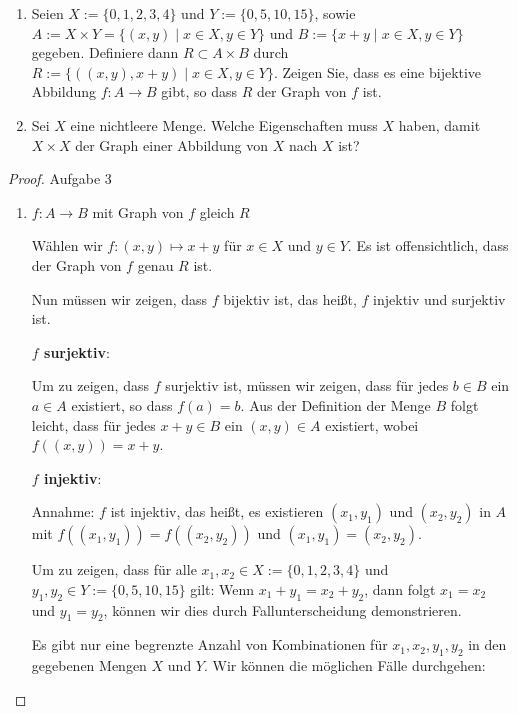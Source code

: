 \documentclass{../problemset}
\begin{document}
\pagebreak

\begin{problem}[Graphen]
\begin{enumerate}
	\item Seien $X := \{0, 1, 2, 3, 4\}$ und $Y := \{0, 5, 10, 15\}$, sowie $A := X \times Y = \{(x, y) \mid x \in X, y \in Y\}$ und $B := \{x + y \mid x \in X, y \in Y\}$ gegeben. Definiere dann $R \subset A \times B$ durch $R := \{((x, y), x + y) \mid x \in X, y \in Y\}$.
	      Zeigen Sie, dass es eine bijektive Abbildung $f : A \to B$ gibt, so dass $R$ der Graph von $f$ ist.

	\item Sei $X$ eine nichtleere Menge. Welche Eigenschaften muss $X$ haben, damit $X \times X$ der Graph einer Abbildung von $X$ nach $X$ ist?

\end{enumerate}

\begin{proof} Aufgabe 3

	\begin{enumerate}
		\item $f: A \rightarrow B$ mit Graph von $f$ gleich $R$

		      Wählen wir \(f: (x, y) \mapsto x + y\) für \(x \in X\) und \(y \in Y\).
		      Es ist offensichtlich, dass der Graph von \(f\) genau \(R\) ist.

		      Nun müssen wir zeigen, dass \(f\) bijektiv ist, das heißt, \(f\) injektiv und surjektiv ist.

		      \textbf{\(f\) surjektiv}:

		      Um zu zeigen, dass \(f\) surjektiv ist, müssen wir zeigen, dass für jedes \(b \in B\) ein \(a \in A\) existiert, so dass \(f(a) = b\).
		      Aus der Definition der Menge \(B\) folgt leicht, dass für jedes \(x + y \in B\) ein \((x, y) \in A\) existiert, wobei \(f((x, y)) = x + y\).

		      \textbf{\(f\) injektiv}:

		      Annahme: \(f\) ist injektiv, das heißt, es existieren \((x_1, y_1)\) und \((x_2, y_2)\) in \(A\) mit \(f((x_1, y_1)) = f((x_2, y_2))\) und \((x_1, y_1) = (x_2, y_2)\).

		      Um zu zeigen, dass für alle \(x_1, x_2 \in X := \{0, 1, 2, 3, 4\}\) und \(y_1, y_2 \in Y := \{0, 5, 10, 15\}\) gilt: Wenn \(x_1 + y_1 = x_2 + y_2\), dann folgt \(x_1 = x_2\) und \(y_1 = y_2\), können wir dies durch Fallunterscheidung demonstrieren.

		      Es gibt nur eine begrenzte Anzahl von Kombinationen für \(x_1, x_2, y_1, y_2\) in den gegebenen Mengen \(X\) und \(Y\). Wir können die möglichen Fälle durchgehen:


\end{enumerate}
\end{proof}
\end{problem}
\end{document}
